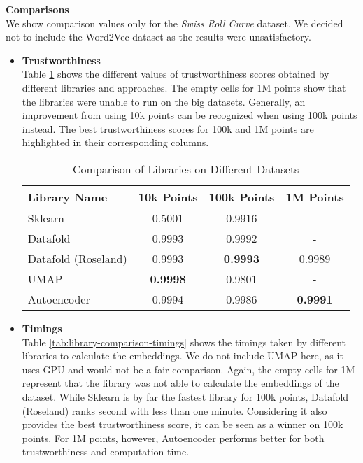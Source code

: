 \textbf{Comparisons}\\
We show comparison values only for the \textit{Swiss Roll Curve} dataset. We decided not to include the Word2Vec dataset as the results were unsatisfactory.
\begin{itemize}
    \item \textbf{Trustworthiness}\\
    Table \ref{tab:library-comparison} shows the different values of trustworthiness scores obtained by different libraries and approaches. The empty cells for 1M points show that the libraries were unable to run on the big datasets. Generally, an improvement from using 10k points can be recognized when using 100k points instead. The best trustworthiness scores for 100k and 1M points are highlighted in their corresponding columns. 
    \begin{table}[h]
    \centering
    \begin{tabular}{|l|c|c|c|}
        \hline
        \textbf{Library Name} & \textbf{10k Points} & \textbf{100k Points} & \textbf{1M Points} \\
        \hline
        \hline
        Sklearn & 0.5001 & 0.9916 & - \\
        \hline
        Datafold & 0.9993 & 0.9992 & - \\
        \hline
        Datafold (Roseland) & 0.9993 & \textbf{0.9993} & 0.9989 \\
        \hline
        UMAP & \textbf{0.9998} & 0.9801 & - \\
        \hline
        Autoencoder & 0.9994 & 0.9986 & \textbf{0.9991} \\
        \hline
    \end{tabular}
    \caption{Comparison of Libraries on Different Datasets}
    \label{tab:library-comparison}
\end{table}
    \item \textbf{Timings}\\
    Table \ref{tab:library-comparison-timings} shows the timings taken by different libraries to calculate the embeddings. We do not include UMAP here, as it uses GPU and would not be a fair comparison. Again, the empty cells for 1M represent that the library was not able to calculate the embeddings of the dataset. While Sklearn is by far the fastest library for 100k points, Datafold (Roseland) ranks second with less than one minute. Considering it also provides the best trustworthiness score, it can be seen as a winner on 100k points. For 1M points, however, Autoencoder performs better for both trustworthiness and computation time. \\

\end{itemize}
